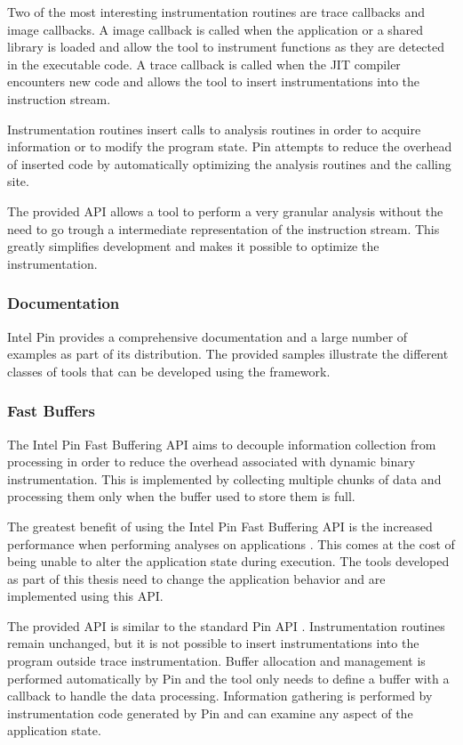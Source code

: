 Two of the most interesting instrumentation routines are trace callbacks and image callbacks. A image callback is called when the application or a shared library is loaded and allow the tool to instrument functions as they are detected in the executable code. A trace callback is called when the JIT compiler encounters new code and allows the tool to insert instrumentations into the instruction stream.

Instrumentation routines insert calls to analysis routines in order to acquire information or to modify the program state. Pin attempts to reduce the overhead of inserted code by automatically optimizing the analysis routines and the calling site.

The provided API allows a tool to perform a very granular analysis without the need to go trough a intermediate representation of the instruction stream. This greatly simplifies development and makes it possible to optimize the instrumentation.

\subsubsection{Documentation}

Intel Pin provides a comprehensive documentation \cite{pindoc} and a large number of examples as part of its distribution. The provided samples illustrate the different classes of tools that can be developed using the framework.

\subsubsection{Fast Buffers}

The Intel Pin Fast Buffering API \cite{pinbuffer} aims to decouple information collection from processing in order to reduce the overhead associated with dynamic binary instrumentation. This is implemented by collecting multiple chunks of data and processing them only when the buffer used to store them is full.

The greatest benefit of using the Intel Pin Fast Buffering API is the increased performance when performing analyses on applications \cite{pinbuffer}. This comes at the cost of being unable to alter the application state during execution. The tools developed as part of this thesis need to change the application behavior and are implemented using this API.

The provided API is similar to the standard Pin API \cite{pindoc}. Instrumentation routines remain unchanged, but it is not possible to insert instrumentations into the program outside trace instrumentation. Buffer allocation and management is performed automatically by Pin and the tool only needs to define a buffer with a callback to handle the data processing. Information gathering is performed by instrumentation code generated by Pin and can examine any aspect of the application state.

